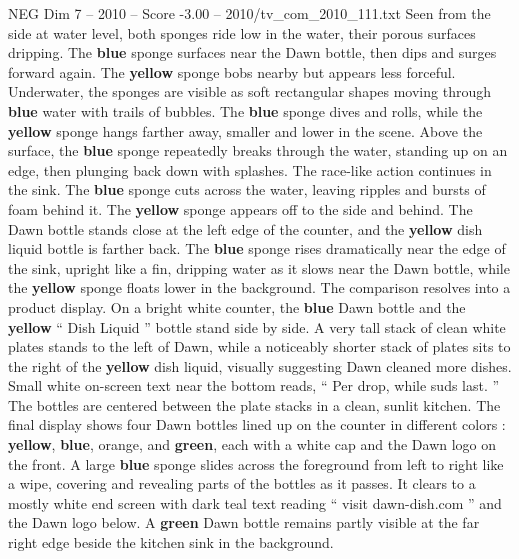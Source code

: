 \begin{textsample}{NEG Dim 7 – 2010 – Score -3.00 – 2010/tv\_com\_2010\_111.txt}
Seen from the side at water level, both sponges ride low in the water, their porous surfaces dripping.
The \textbf{blue} sponge surfaces near the Dawn bottle, then dips and surges forward again.
The \textbf{yellow} sponge bobs nearby but appears less forceful.
Underwater, the sponges are visible as soft rectangular shapes moving through \textbf{blue} water with trails of bubbles.
The \textbf{blue} sponge dives and rolls, while the \textbf{yellow} sponge hangs farther away, smaller and lower in the scene.
Above the surface, the \textbf{blue} sponge repeatedly breaks through the water, standing up on an edge, then plunging back down with splashes.
The race-like action continues in the sink.
The \textbf{blue} sponge cuts across the water, leaving ripples and bursts of foam behind it.
The \textbf{yellow} sponge appears off to the side and behind.
The Dawn bottle stands close at the left edge of the counter, and the \textbf{yellow} dish liquid bottle is farther back.
The \textbf{blue} sponge rises dramatically near the edge of the sink, upright like a fin, dripping water as it slows near the Dawn bottle, while the \textbf{yellow} sponge floats lower in the background.
The comparison resolves into a product display.
On a bright white counter, the \textbf{blue} Dawn bottle and the \textbf{yellow} “ Dish Liquid ” bottle stand side by side.
A very tall stack of clean white plates stands to the left of Dawn, while a noticeably shorter stack of plates sits to the right of the \textbf{yellow} dish liquid, visually suggesting Dawn cleaned more dishes.
Small white on-screen text near the bottom reads, “ Per drop, while suds last. ” The bottles are centered between the plate stacks in a clean, sunlit kitchen.
The final display shows four Dawn bottles lined up on the counter in different colors : \textbf{yellow}, \textbf{blue}, orange, and \textbf{green}, each with a white cap and the Dawn logo on the front.
A large \textbf{blue} sponge slides across the foreground from left to right like a wipe, covering and revealing parts of the bottles as it passes.
It clears to a mostly white end screen with dark teal text reading “ visit dawn-dish.com ” and the Dawn logo below.
A \textbf{green} Dawn bottle remains partly visible at the far right edge beside the kitchen sink in the background.

\end{textsample}
